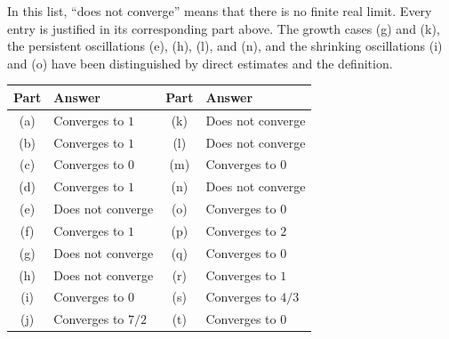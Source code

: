 In this list, ``does not converge'' means that there is no finite
real limit. Every entry is justified in its corresponding part above.
The growth cases (g) and (k), the persistent oscillations (e), (h),
(l), and (n), and the shrinking oscillations (i) and (o) have been
distinguished by direct estimates and the definition.

\begin{center}
\begin{tabular}{@{}cl@{\qquad}cl@{}}
\toprule
Part&Answer&Part&Answer\\ \midrule
(a)&Converges to $1$&(k)&Does not converge\\
(b)&Converges to $1$&(l)&Does not converge\\
(c)&Converges to $0$&(m)&Converges to $0$\\
(d)&Converges to $1$&(n)&Does not converge\\
(e)&Does not converge&(o)&Converges to $0$\\
(f)&Converges to $1$&(p)&Converges to $2$\\
(g)&Does not converge&(q)&Converges to $0$\\
(h)&Does not converge&(r)&Converges to $1$\\
(i)&Converges to $0$&(s)&Converges to $4/3$\\
(j)&Converges to $7/2$&(t)&Converges to $0$\\
\bottomrule
\end{tabular}
\end{center}
